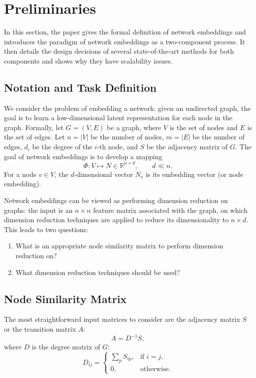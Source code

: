 \documentclass[11pt]{article}
\begin{document}
\section{Preliminaries}

In this section, the paper gives the formal definition of network embeddings and introduces the paradigm of network embeddings as a two-component process. It then details the design decisions of several state-of-the-art methods for both components and shows why they have scalability issues.

\subsection{Notation and Task Definition}

We consider the problem of embedding a network: given an undirected graph, the goal is to learn a low-dimensional latent representation for each node in the graph. Formally, let $G=(V,E)$ be a graph, where $V$ is the set of nodes and $E$ is the set of edges. Let $n=|V|$ be the number of nodes, $m=|E|$ be the number of edges, $d_i$ be the degree of the $i$-th node, and $S$ be the adjacency matrix of $G$. The goal of network embeddings is to develop a mapping
\[
\Phi: V \mapsto N \in \mathbb{R}^{n \times d}, \qquad d \ll n.
\]
For a node $v \in V$, the $d$-dimensional vector $N_v$ is its embedding vector (or node embedding).

Network embeddings can be viewed as performing dimension reduction on graphs: the input is an $n \times n$ feature matrix associated with the graph, on which dimension reduction techniques are applied to reduce its dimensionality to $n \times d$. This leads to two questions:
\begin{enumerate}[leftmargin=1.5em]
    \item What is an appropriate node similarity matrix to perform dimension reduction on?
    \item What dimension reduction techniques should be used?
\end{enumerate}

\subsection{Node Similarity Matrix}

The most straightforward input matrices to consider are the adjacency matrix $S$ or the transition matrix $A$:
\begin{equation}
A = D^{-1}S,
\end{equation}
where $D$ is the degree matrix of $G$:
\[
D_{ij} =
\begin{cases}
\sum_p S_{ip}, & \text{if } i=j, \\
0, & \text{otherwise.}
\end{cases}
\]
\end{document}
